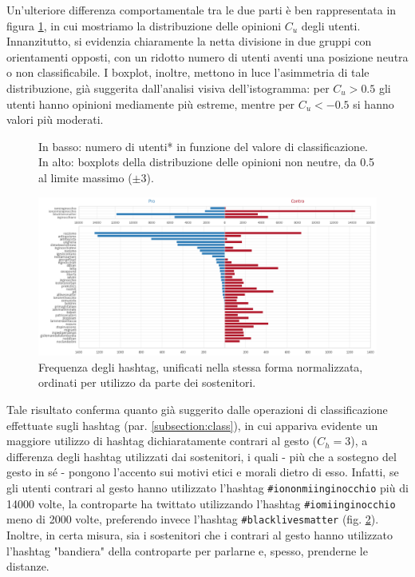     Un'ulteriore differenza comportamentale tra le due parti è ben rappresentata in figura \ref{almenotot}, in cui mostriamo la distribuzione delle opinioni $C_{u}$ degli utenti. Innanzitutto, si evidenzia chiaramente la netta divisione in due gruppi con orientamenti opposti, con un ridotto numero di utenti aventi una posizione neutra o non classificabile. I boxplot, inoltre, mettono in luce l'asimmetria %
    di tale distribuzione, già suggerita dall'analisi visiva dell'istogramma: per $C_{u}>0.5$ gli utenti hanno opinioni mediamente più estreme, mentre per $C_{u}<-0.5$ si hanno valori più moderati. 
    
    \begin{center}
        \vspace{2mm}
        \begin{figure}[h!]
        \caption{In basso: numero di utenti* in funzione del valore di classificazione. In alto: boxplots della distribuzione delle opinioni non neutre, da 0.5 al limite massimo ($\pm 3$). }
        \label{almenotot}
        \end{figure}
    \end{center}
    \vspace{-5mm}
    
    \begin{figure}[b]
        \centering
        \includegraphics[scale=.34]{7_Open_question/distr hashtag senza neutri.png}
        \caption{Frequenza degli hashtag, unificati nella stessa forma normalizzata, ordinati per utilizzo da parte dei sostenitori.}
        \label{distr_hash}
    \end{figure}
    
    Tale risultato conferma quanto già suggerito dalle operazioni di classificazione effettuate sugli hashtag (par. \ref{subsection:class}), in cui appariva evidente un maggiore utilizzo di hashtag dichiaratamente contrari al gesto ($C_{h}=3$), a differenza degli hashtag utilizzati dai sostenitori, i quali - più che a sostegno del gesto in sé - pongono l'accento sui motivi etici e morali dietro di esso. Infatti, se gli utenti contrari al gesto hanno utilizzato l'hashtag \texttt{\#iononmiinginocchio} più di 14000 volte, la controparte ha twittato utilizzando l'hashtag \texttt{\#iomiinginocchio} meno di 2000 volte, preferendo invece l'hashtag \texttt{\#blacklivesmatter} (fig. \ref{distr_hash}). Inoltre, in certa misura, sia i sostenitori che i contrari al gesto hanno utilizzato l'hashtag "bandiera" della controparte per parlarne e, spesso, prenderne le distanze.
    
